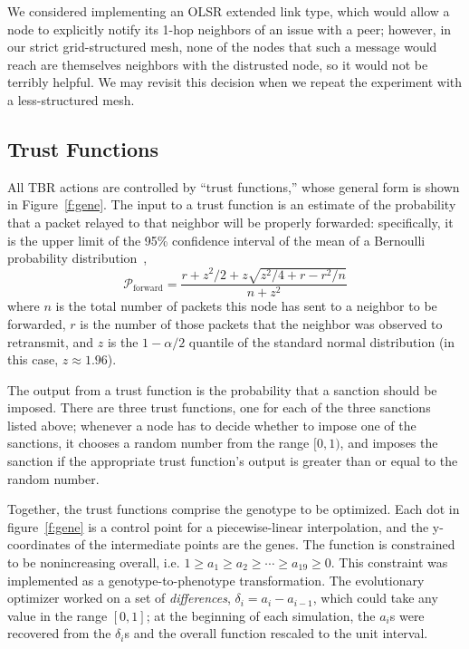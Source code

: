 \documentclass{article}
\begin{document}
We considered implementing an OLSR extended link type, which would
allow a node to explicitly notify its 1-hop neighbors of an issue with
a peer; however, in our strict grid-structured mesh, none of the nodes
that such a message would reach are themselves neighbors with the
distrusted node, so it would not be terribly helpful.  We may revisit
this decision when we repeat the experiment with a less-structured
mesh.

\subsection{Trust Functions}

All TBR actions are controlled by “trust functions,” whose general
form is shown in Figure~\ref{f:gene}.  The input to a trust function
is an estimate of the probability that a packet relayed to that
neighbor will be properly forwarded: specifically, it is the upper
limit of the 95\% confidence interval of the mean of a Bernoulli
probability distribution~\cite{wilson1927},
\begin{equation*}
\mathcal{P}_{\text{forward}} =
\frac{r + z^2\slash2 + z\sqrt{z^2/4 + r - r^2\slash n}}
{n + z^2}
\end{equation*}
where $n$ is the total number of packets this node has sent to a
neighbor to be forwarded, $r$ is the number of those packets that the
neighbor was observed to retransmit, and $z$ is the $1-\alpha/2$
quantile of the standard normal distribution (in this case,
$z\approx1.96$).

The output from a trust function is the probability that a sanction
should be imposed.  There are three trust functions, one for each of
the three sanctions listed above; whenever a node has to decide
whether to impose one of the sanctions, it chooses a random number
from the range $[0,1)$, and imposes the sanction if the appropriate
trust function's output is greater than or equal to the random number.

Together, the trust functions comprise the genotype to be optimized.
Each dot in figure~\ref{f:gene} is a control point for a
piecewise-linear interpolation, and the y-coordinates of the
intermediate points are the genes.  The function is constrained to be
nonincreasing overall, i.e. $1 \ge a_1 \ge a_2 \ge \cdots \ge a_{19}
\ge 0$.  This constraint was implemented as a genotype-to-phenotype
transformation.  The evolutionary optimizer worked on a set of
\emph{differences}, $\delta_i = a_i - a_{i-1}$, which could take any
value in the range $[0,1]$; at the beginning of each simulation, the
$a_i$s were recovered from the $\delta_i$s and the overall function
rescaled to the unit interval.
\end{document}
